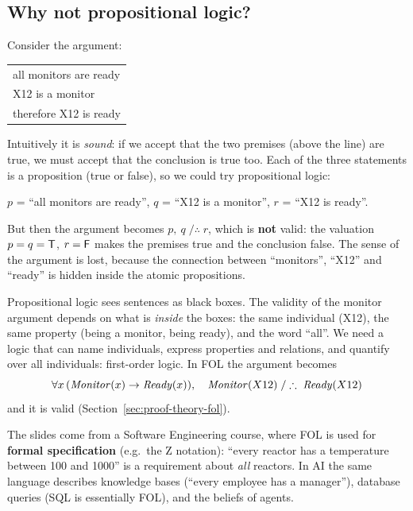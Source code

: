 \subsection{Why not propositional logic?}
\label{sec:why-fol}

Consider the argument:
\begin{center}
\begin{tabular}{l}
all monitors are ready \\
X12 is a monitor \\
\hline
therefore X12 is ready
\end{tabular}
\end{center}
Intuitively it is \emph{sound}: if we accept that the two premises (above the line) are
true, we must accept that the conclusion is true too. Each of the three statements is a
proposition (true or false), so we could try propositional logic:
\begin{center}
$p$ = ``all monitors are ready'', \quad $q$ = ``X12 is a monitor'', \quad $r$ = ``X12 is ready''.
\end{center}
But then the argument becomes $p,\ q \;/\therefore\; r$, which is \textbf{not} valid: the
valuation $p = q = \mathsf{T}$, $r = \mathsf{F}$ makes the premises true and the conclusion false.
The sense of the argument is lost, because the connection between ``monitors'',
``X12'' and ``ready'' is hidden inside the atomic propositions.

\begin{nbintuition}
Propositional logic sees sentences as black boxes. The validity of the monitor argument
depends on what is \emph{inside} the boxes: the same individual (X12), the same property
(being a monitor, being ready), and the word ``all''. We need a logic that can name
individuals, express properties and relations, and quantify over all individuals:
first-order logic. In FOL the argument becomes
\[
\forall x\,(\mathit{Monitor}(x) \rightarrow \mathit{Ready}(x)),\quad \mathit{Monitor}(X12)
\;/\therefore\; \mathit{Ready}(X12)
\]
and it is valid (Section~\ref{sec:proof-theory-fol}).
\end{nbintuition}

\begin{nbwhy}
The slides come from a Software Engineering course, where FOL is used for \textbf{formal
specification} (e.g.\ the Z notation): ``every reactor has a temperature between 100 and
1000'' is a requirement about \emph{all} reactors. In AI the same language describes
knowledge bases (``every employee has a manager''), database queries (SQL is essentially
FOL), and the beliefs of agents.
\end{nbwhy}
